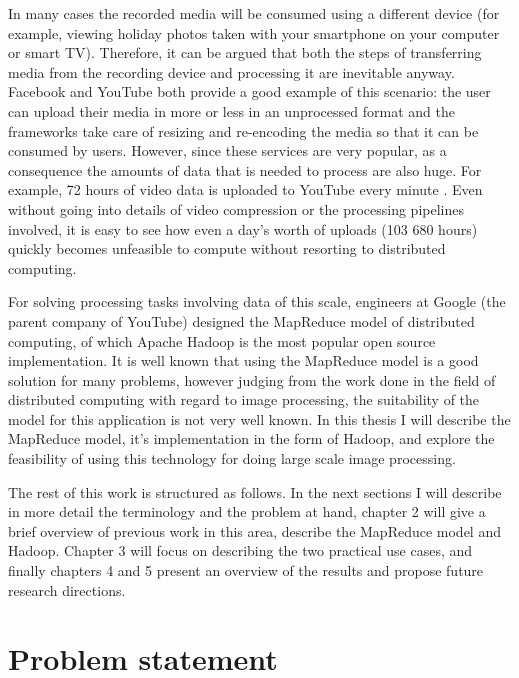 \documentclass [12pt,a4paper]{report}
\begin{document}
In many cases the recorded media will be consumed using a different device (for example, viewing holiday photos taken with your smartphone on your computer or smart TV). Therefore, it can be argued that both the steps of transferring media from the recording device and processing it are inevitable anyway. Facebook and YouTube both provide a good example of this scenario: the user can upload their media in more or less in an unprocessed format and the frameworks take care of resizing and re-encoding the media so that it can be consumed by users. However, since these services are very popular, as a consequence the amounts of data that is needed to process are also huge. For example, 72 hours of video data is uploaded to YouTube every minute \cite{youtube_stats}. Even without going into details of video compression or the processing pipelines involved, it is easy to see how even a day's worth of uploads (103 680 hours) quickly becomes unfeasible to compute without resorting to distributed computing.

For solving processing tasks involving data of this scale, engineers at Google (the parent company of YouTube) designed the MapReduce model of distributed computing, of which Apache Hadoop is the most popular open source implementation. It is well known that using the MapReduce model is a good solution for many problems, however judging from the work done in the field of distributed computing with regard to image processing, the suitability of the model for this application is not very well known. In this thesis I will describe the MapReduce model, it's implementation in the form of Hadoop, and explore the feasibility of using this technology for doing large scale image processing.

The rest of this work is structured as follows. In the next sections I will describe in more detail the terminology and the problem at hand, chapter 2 will give a brief overview of previous work in this area, describe the MapReduce model and Hadoop. Chapter 3 will focus on describing the two practical use cases, and finally chapters 4 and 5 present an overview of the results and propose future research directions.

\section{Problem statement}
\end{document}

